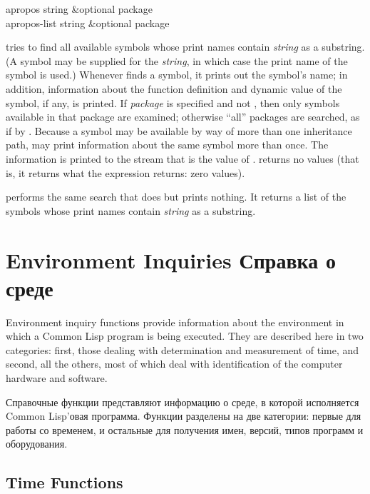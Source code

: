 \begin{defun}[Function]
apropos string &optional package \\
apropos-list string &optional package

 tries to find all available symbols whose print names
contain \emph{string} as a substring.  (A symbol may be supplied for
the \emph{string}, in which case the print name of the symbol is used.)
Whenever  finds a symbol, it prints
out the symbol's name; in addition,
information about the function definition and dynamic value of the symbol,
if any, is printed.
If \emph{package} is specified and not {\nil}, then only symbols
available in that package are examined;
otherwise ``all'' packages are searched, as if by .
Because a symbol may be available by way of more than one inheritance
path,  may print information about the same symbol more than once.
The information is printed to the stream that is the value
of .
 returns no values (that is, it returns what the expression
 returns: zero values).

 performs the same search that  does but
prints nothing.  It returns a list of the symbols whose print names
contain \emph{string} as a substring.
\end{defun}

\section{Environment Inquiries Справка о среде}

Environment inquiry functions provide information about the
environment in which a Common Lisp program is being executed.
They are described here in two categories: first, those dealing with
determination and measurement of time, and second, all the others,
most of which deal with identification of the computer hardware
and software.

Справочные функции представляют информацию о среде, в которой исполняется Common
Lisp'овая программа.
Функции разделены на две категории: первые для работы со временем, и остальные
для получения имен, версий, типов программ и оборудования.

\subsection{Time Functions}
\label{TIME-SECTION}

